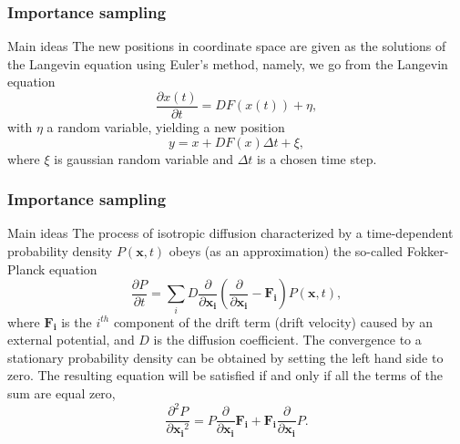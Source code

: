 \documentclass{beamer}
\begin{document}
\begin{frame}
\frametitle{Importance sampling}

\begin{block}{Main ideas }
The new positions in coordinate space are given as the solutions of the Langevin equation using Euler's method, namely,
we go from the Langevin equation
\[ 
   \frac{\partial x(t)}{\partial t} = DF(x(t)) +\eta,
\]
with $\eta$ a random variable,
yielding a new position 
\[
   y = x+DF(x)\Delta t +\xi,
\]
where $\xi$ is gaussian random variable and $\Delta t$ is a chosen time step. 

\end{block}
\end{frame}

\begin{frame}
\frametitle{Importance sampling}

\begin{block}{Main ideas }
The process of isotropic diffusion characterized by a time-dependent probability density $P(\mathbf{x},t)$ obeys (as an approximation) the so-called Fokker-Planck equation 
\[
   \frac{\partial P}{\partial t} = \sum_i D\frac{\partial }{\partial \mathbf{x_i}}\left(\frac{\partial }{\partial \mathbf{x_i}} -\mathbf{F_i}\right)P(\mathbf{x},t),
\]
where $\mathbf{F_i}$ is the $i^{th}$ component of the drift term (drift velocity) caused by an external potential, and $D$ is the diffusion coefficient. The convergence to a stationary probability density can be obtained by setting the left hand side to zero. The resulting equation will be satisfied if and only if all the terms of the sum are equal zero,
\[
\frac{\partial^2 P}{\partial {\mathbf{x_i}^2}} = P\frac{\partial}{\partial {\mathbf{x_i}}}\mathbf{F_i} + \mathbf{F_i}\frac{\partial}{\partial {\mathbf{x_i}}}P.
\]
\end{block}
\end{frame}
\end{document}

